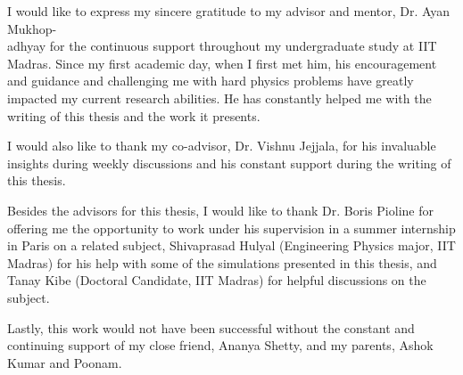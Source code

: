 I would like to express my sincere gratitude to my advisor and mentor, Dr. Ayan Mukhop-\\adhyay\footnotemark{} for the continuous support throughout my undergraduate study at IIT Madras. Since my first academic day, when I first met him, his encouragement and guidance and challenging me with hard physics problems have greatly impacted my current research abilities. He has constantly helped me with the writing of this thesis and the work it presents.

I would also like to thank my co-advisor, Dr. Vishnu Jejjala\footnotemark{}, for his invaluable insights during weekly discussions and his constant support during the writing of this thesis.

Besides the advisors for this thesis, I would like to thank Dr. Boris Pioline\footnotemark{} for offering me the opportunity to work under his supervision in a summer internship in Paris on a related subject, Shivaprasad Hulyal (Engineering Physics major, IIT Madras) for his help with some of the simulations presented in this thesis, and Tanay Kibe (Doctoral Candidate, IIT Madras) for helpful discussions on the subject.

Lastly, this work would not have been successful without the constant and continuing support of my close friend, Ananya Shetty, and my parents, Ashok Kumar and Poonam.